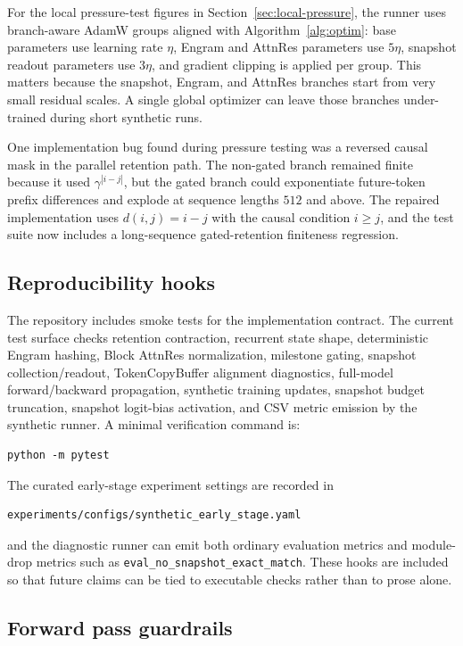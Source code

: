 \documentclass[11pt]{article}
\begin{document}
For the local pressure-test figures in Section~\ref{sec:local-pressure}, the runner uses branch-aware AdamW groups aligned with Algorithm~\ref{alg:optim}: base parameters use learning rate $\eta$, Engram and AttnRes parameters use $5\eta$, snapshot readout parameters use $3\eta$, and gradient clipping is applied per group. This matters because the snapshot, Engram, and AttnRes branches start from very small residual scales. A single global optimizer can leave those branches under-trained during short synthetic runs.

One implementation bug found during pressure testing was a reversed causal mask in the parallel retention path. The non-gated branch remained finite because it used $\gamma^{|i-j|}$, but the gated branch could exponentiate future-token prefix differences and explode at sequence lengths $512$ and above. The repaired implementation uses $d(i,j)=i-j$ with the causal condition $i\geq j$, and the test suite now includes a long-sequence gated-retention finiteness regression.

\subsection{Reproducibility hooks}

The repository includes smoke tests for the implementation contract. The current test surface checks retention contraction, recurrent state shape, deterministic Engram hashing, Block AttnRes normalization, milestone gating, snapshot collection/readout, TokenCopyBuffer alignment diagnostics, full-model forward/backward propagation, synthetic training updates, snapshot budget truncation, snapshot logit-bias activation, and CSV metric emission by the synthetic runner. A minimal verification command is:
\begin{verbatim}
python -m pytest
\end{verbatim}
The curated early-stage experiment settings are recorded in
\begin{verbatim}
experiments/configs/synthetic_early_stage.yaml
\end{verbatim}
and the diagnostic runner can emit both ordinary evaluation metrics and module-drop metrics such as \texttt{eval\_no\_snapshot\_exact\_match}. These hooks are included so that future claims can be tied to executable checks rather than to prose alone.

\subsection{Forward pass guardrails}
\end{document}
